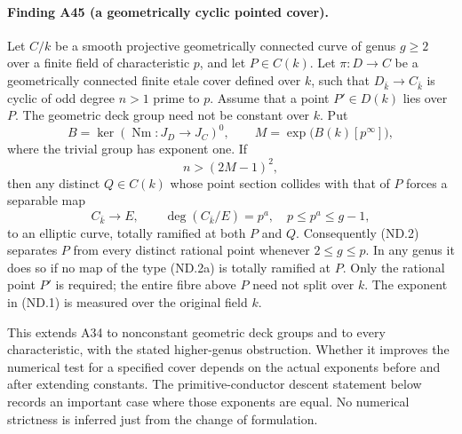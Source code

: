 \documentclass[11pt,a4paper]{article}
\begin{document}
\paragraph{Finding A45 (a geometrically cyclic pointed cover).}
Let $C/k$ be a smooth projective geometrically connected
curve of genus $g\ge2$ over a finite field of characteristic $p$,
and let $P\in C(k)$.
Let $\pi:D\to C$ be a geometrically connected finite etale cover
defined over $k$, such that $D_{\bar k}\to C_{\bar k}$ is cyclic
of odd degree $n>1$ prime to $p$. Assume that a point $P'\in D(k)$ lies over $P$.
The geometric deck group need not be constant over $k$. Put
\[
 B=\ker(\operatorname{Nm}:J_D\longrightarrow J_C)^0,
 \qquad M=\exp\bigl(B(k)[p^\infty]\bigr),
 \tag{ND.1}
\]
where the trivial group has exponent one. If
\[
                         n>(2M-1)^2,
 \tag{ND.2}
\]
then any distinct $Q\in C(k)$ whose point section collides with
that of $P$ forces a separable map
\[
 C_{\bar k}\longrightarrow E,\qquad
 \deg(C_{\bar k}/E)=p^a,\quad p\le p^a\le g-1,
 \tag{ND.2a}
\]
to an elliptic curve, totally ramified at both $P$ and $Q$.
Consequently (ND.2) separates $P$ from every distinct rational
point whenever $2\le g\le p$. In any genus it does so if no
map of the type (ND.2a) is totally ramified at $P$.
Only the rational point $P'$ is required; the entire fibre above
$P$ need not split over $k$. The exponent in (ND.1) is measured
over the original field $k$.

This extends A34 to nonconstant geometric deck groups and to
every characteristic, with the stated higher-genus obstruction. Whether it improves the numerical test for a specified
cover depends on the actual exponents before and after extending
constants. The primitive-conductor descent statement below records
an important case where those exponents are equal. No numerical
strictness is inferred just from the change of formulation.
\end{document}
